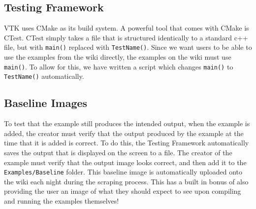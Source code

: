 \documentclass[a4paper,10pt]{IEEEtran}
\begin{document}
\subsection{Testing Framework}
VTK uses CMake as its build system. A powerful tool that comes with CMake is CTest. CTest simply takes a file that is structured identically to a standard c++ file, but with \verb|main()| replaced with \verb|TestName()|. Since we want users to be able to use the examples from the wiki directly, the examples on the wiki must use \verb|main()|. To allow for this, we have written a script which changes \verb|main()| to \verb|TestName()| automatically.

\subsection{Baseline Images}
To test that the example still produces the intended output, when the example is added, the creator must verify that the output produced by the example at the time that it is added is correct. To do this, the Testing Framework automatically saves the output that is displayed on the screen to a file. The creator of the example must verify that the output image looks correct, and then add it to the \verb|Examples/Baseline| folder. This baseline image is automatically uploaded onto the wiki each night during the scraping process. This has a built in bonus of also providing the user an image of what they should expect to see upon compiling and running the examples themselves!
\end{document}
